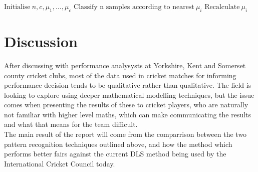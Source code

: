 \documentclass[11pt]{amsart}
\begin{document}
\begin{algorithmic}[1]
    \State $\text{Initialise} \ n,c,\mu_1,\ldots,\mu_c$
    \Repeat
        \State $\text{Classify n samples according to nearest} \ \mu_i$
        \State $\text{Recalculate} \ \mu_i$
\end{algorithmic}

\section{Discussion}
After discussing with performance analysysts at Yorkshire, Kent and Somerset county cricket clubs, most of the data used in cricket 
matches for informing performance decision tends to be qualitative rather than qualitative. The field is looking to explore using deeper
mathematical modelling techniques, but the issue comes when presenting the results of these to cricket players, who are naturally not 
familiar with higher level maths, which can make communicating the results and what that means for the team difficult. \\

The main result of the report will come from the comparrison between the two pattern recognition techniques outlined above, and how 
the method which performs better fairs against the current DLS method being used by the International Cricket Council today.  


{}

\end{document}
